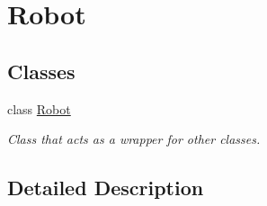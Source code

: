 \hypertarget{group___robot}{}\section{Robot}
\label{group___robot}
\subsection*{Classes}
\begin{DoxyCompactItemize}
\item 
class \mbox{\hyperlink{class_robot}{Robot}}
\begin{DoxyCompactList}\small\item\em Class that acts as a wrapper for other classes. \end{DoxyCompactList}\end{DoxyCompactItemize}


\subsection{Detailed Description}

